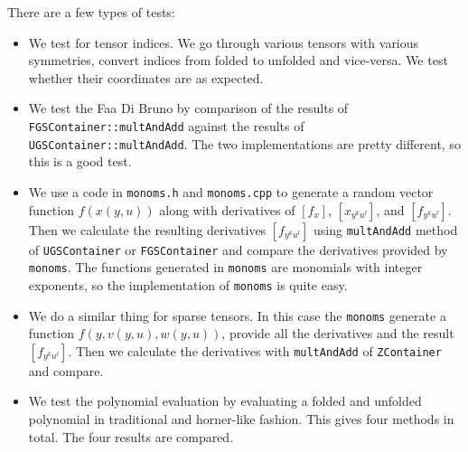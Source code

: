 \documentclass[11pt,a4paper]{article}
\begin{document}
There are a few types of tests:
\begin{itemize}
\item We test for tensor indices. We go through various tensors with
various symmetries, convert indices from folded to unfolded and
vice-versa. We test whether their coordinates are as expected.
\item We test the Faa Di Bruno by comparison of the results of
\texttt{FGSContainer::multAndAdd} against the results of \texttt{UGSContainer::multAndAdd}. The two
 implementations are pretty different, so this is a good test.
\item We use a code in {\tt monoms.h} and {\tt monoms.cpp} to generate a
 random vector function $f(x(y,u))$ along with derivatives of
 $\left[f_x\right]$, $\left[x_{y^ku^l}\right]$, and
 $\left[f_{y^ku^l}\right]$. Then we calculate the resulting derivatives
 $\left[f_{y^ku^l}\right]$ using \texttt{multAndAdd} method of \texttt{UGSContainer}
 or \texttt{FGSContainer} and compare the derivatives provided by {\tt
 monoms}. The functions generated in {\tt monoms} are monomials with
 integer exponents, so the implementation of {\tt monoms} is quite
 easy.
\item We do a similar thing for sparse tensors. In this case the {\tt monoms}
 generate a function $f(y,v(y,u),w(y,u))$, provide all the derivatives
 and the result $\left[f_{y^ku^l}\right]$. Then we calculate the
 derivatives with \texttt{multAndAdd} of \texttt{ZContainer} and compare.
\item We test the polynomial evaluation by evaluating a folded and
 unfolded polynomial in traditional and horner-like fashion. This gives
 four methods in total. The four results are compared.
\end{itemize}
\end{document}
